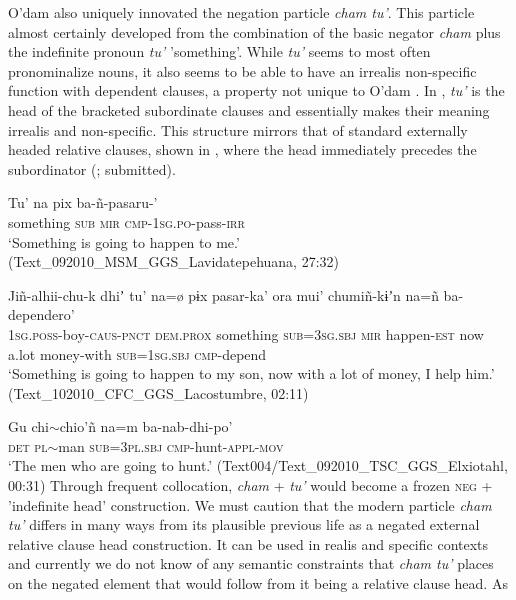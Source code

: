 \documentclass[output=paper]{langsci/langscibook}
\begin{document}
O'dam also uniquely innovated the negation particle \emph{cham tu'}. This particle almost certainly developed from the combination of the basic negator \emph{cham} plus the indefinite pronoun \emph{tu'} 'something'. While \emph{tu'} seems to most often pronominalize nouns, it also seems to be able to have an irrealis non-specific function with dependent clauses, a property not unique to O'dam \citep{Haspelmath1997}. In , \emph{tu'} is the head of the bracketed subordinate clauses and essentially makes their meaning irrealis and non-specific. This structure mirrors that of standard externally headed relative clauses, shown in , where the head immediately precedes the subordinator  (\citeauthor{garciasubm}; submitted).
\ea
\label{ex:odam-sometheve}
\begin{xlist}
\item\gll Tu’ na pix ba-ñ-pasaru-’\\
something \textsc{sub} \textsc{mir} \textsc{cmp-1sg.po}-pass-\textsc{irr}\\
\glt ‘Something is going to happen to me.’ (Text\_092010\_MSM\_GGS\_Lavidatepehuana, 27:32)
\item\gll Jiñ-alhii-chu-k dhiʼ tu’ {{\ob}}{na=\o} {pɨx} pasar-ka'{{\cb}} ora mui' chumiñ-kɨʼn na=ñ ba-dependero'\\
\textsc{1sg.poss}-boy-\textsc{caus-pnct} \textsc{dem.prox} something \textsc{sub=3sg.sbj} \textsc{mir} happen-\textsc{est} now a.lot money-with \textsc{sub=1sg.sbj} \textsc{cmp}-depend\\
\glt ‘Something is going to happen to my son, now with a lot of money, I help him.’
(Text\_102010\_CFC\_GGS\_Lacostumbre, 02:11)
\end{xlist}
\z
\ea
\label{ex:odam-exheadrel}
\gll Gu chi$\sim$chio’ñ 	{{\ob}}na=m ba-nab-dhi-po’{{\cb}}\\
	\textsc{det} \textsc{pl}$\sim$man	\textsc{sub=3pl.sbj} \textsc{cmp}-hunt-\textsc{appl-mov}\\
\glt ‘The men who are going to hunt.’ (Text004/Text\_092010\_TSC\_GGS\_Elxiotahl, 00:31)
\z
Through frequent collocation, \emph{cham} + \emph{tu'} would become a
frozen \textsc{neg} + 'indefinite head' construction. We must caution that
the modern particle \emph{cham tu'} differs in many ways from its plausible
previous life as a negated external relative clause head construction. It
can be used in realis and specific contexts  and currently we
do not know of any semantic constraints that \emph{cham tu'} places on the
negated element that would follow from it being a relative clause head. As
\end{document}
